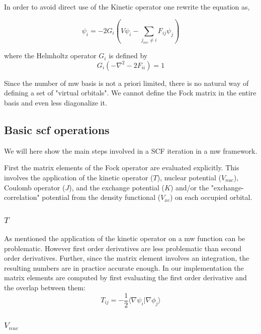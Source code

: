 \documentclass{article}
\begin{document}
In order to avoid direct use of the Kinetic operator one rewrite the equation as, 

\begin{equation}
\psi_i = -2 G_{i}(V\psi_i - \sum_{j_{occ} \ne i} F_{ij} \psi_j)
\end{equation}

where the Helmholtz operator $G_{i}$ is defined by
\begin{equation}
G_{i}(-\nabla^2 - 2 F_{ii} )=1
\end{equation}

Since the number of mw basis is not a priori limited, there is no natural way of defining a set of "virtual orbitals". We cannot define the Fock matrix in the entire basis and even less diagonalize it.


\subsection{Basic scf operations} %

We will here show the main steps involved in a SCF iteration in a mw framework.

First the matrix elements of the Fock operator are evaluated explicitly. This involves the application of the kinetic operator ($T$), nuclear  potential ($V_{nuc}$), Coulomb operator ($J$), and  the exchange potential ($K$) and/or the "exchange-correlation" potential from the density functional ($V_{xc}$) on each occupied orbital.

\subsubsection{$T$}
As mentioned the application of the kinetic operator on a mw function can be problematic. However first order derivatives are less problematic than second order derivatives. Further, since the matrix element involves an integration, the resulting numbers are in practice accurate enough. 
In our implementation the matrix elements are computed by first evaluating the first order derivative and the overlap between them:
\begin{equation}
  T_{ij} = -\frac{1}{2} \langle \nabla \psi_i |\nabla {\phi_j}\rangle
\end{equation}


\subsubsection{$V_{nuc}$}
\end{document}
